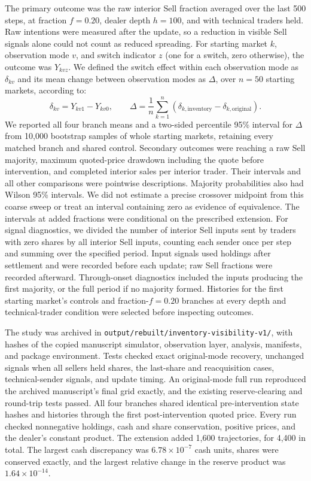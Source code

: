 The primary outcome was the raw interior Sell fraction averaged over
the last 500 steps, at fraction $f=0.20$, dealer depth $h=100$, and with
technical traders held. Raw intentions were measured after the update,
so a reduction in visible Sell signals alone could not count as reduced
spreading. For starting market $k$, observation mode $v$, and switch
indicator $z$ (one for a switch, zero otherwise), the outcome was
$Y_{kvz}$. We defined the switch effect within each observation mode as
$\delta_{kv}$ and its mean change between observation modes as $\Delta$,
over $n=50$ starting markets, according to:
\begin{equation}
\delta_{kv}=Y_{kv1}-Y_{kv0},\qquad
\Delta=\frac{1}{n}\sum_{k=1}^{n}
\left(\delta_{k,\mathrm{inventory}}-\delta_{k,\mathrm{original}}\right).
\label{eq:visibility-contrast}
\end{equation}
We reported all four branch means and a two-sided percentile 95\%
interval for $\Delta$ from 10,000 bootstrap samples of whole starting
markets, retaining every matched branch and shared control. Secondary
outcomes were reaching a raw Sell majority, maximum quoted-price
drawdown including the quote before intervention, and completed interior
sales per interior trader. Their intervals and all other comparisons
were pointwise descriptions. Majority probabilities also had Wilson
95\% intervals. We did not estimate a precise crossover midpoint from
this coarse sweep or treat an interval containing zero as evidence of
equivalence. The intervals at added fractions were conditional on the
prescribed extension. For signal diagnostics, we divided the number
of interior Sell inputs sent by traders with zero shares by all
interior Sell inputs, counting each sender once per step and summing
over the specified period. Input signals
used holdings after settlement and were recorded before each update;
raw Sell fractions were recorded afterward. Through-onset diagnostics
included the inputs producing the first majority, or the full period
if no majority formed. Histories for the first starting market's
controls and fraction-$f=0.20$ branches at every depth and
technical-trader condition were selected before inspecting outcomes.

The study was archived in
\texttt{output/rebuilt/inventory-visibility-v1/}, with hashes of the
copied manuscript simulator, observation layer, analysis, manifests,
and package environment. Tests checked exact original-mode recovery,
unchanged signals when all sellers held shares, the last-share and
reacquisition cases, technical-sender signals, and update timing. An
original-mode full run reproduced the archived manuscript's final grid
exactly, and the existing reserve-clearing and round-trip tests passed.
All four branches shared identical pre-intervention state hashes and
histories through the first post-intervention quoted price. Every run
checked nonnegative holdings, cash and share conservation, positive
prices, and the dealer's constant product. The extension added 1,600 trajectories, for 4,400 in total. The largest cash discrepancy was $6.78\times10^{-7}$ cash units, shares were conserved exactly, and the largest relative change in the reserve product was $1.64\times10^{-14}$.

